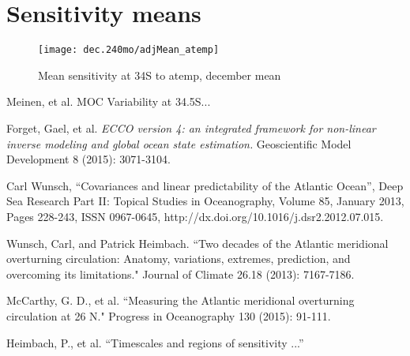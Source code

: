 \documentclass[a4paper,11pt]{article}
\begin{document}
 \section{Sensitivity means}

   \begin{figure}
    \centering
    \texttt{[image: dec.240mo/adjMean\_atemp]}
    \caption{Mean sensitivity at 34S to atemp, december mean}
    \label{fig:decatemp}
   \end{figure}


\begin{thebibliography}{3}

  Meinen, et al. MOC Variability at 34.5S...
  
  Forget, Gael, et al. \textit{ECCO version 4: an integrated framework for non-linear inverse modeling and global ocean state estimation.} Geoscientific Model Development 8 (2015): 3071-3104.
  
  Carl Wunsch, ``Covariances and linear predictability of the Atlantic Ocean'', Deep Sea Research Part II: Topical Studies in Oceanography, Volume 85, January 2013, Pages 228-243, ISSN 0967-0645, http://dx.doi.org/10.1016/j.dsr2.2012.07.015.
  
  Wunsch, Carl, and Patrick Heimbach. ``Two decades of the Atlantic meridional overturning circulation: Anatomy, variations, extremes, prediction, and overcoming its limitations." Journal of Climate 26.18 (2013): 7167-7186.
  
  McCarthy, G. D., et al. ``Measuring the Atlantic meridional overturning circulation at 26 N." Progress in Oceanography 130 (2015): 91-111.

  Heimbach, P., et al. ``Timescales and regions of sensitivity ...''

\end{thebibliography}
\end{document}
